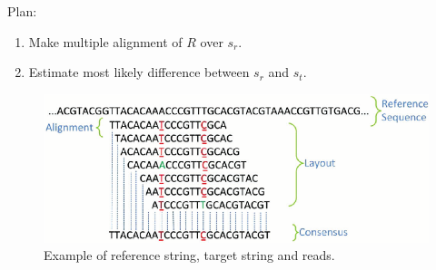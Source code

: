 \documentclass[a4paper, 12pt]{article}
\theoremstyle{definition}
\theoremstyle{definition}
\theoremstyle{remark}
\begin{document}
Plan:
\begin{enumerate}
    \item Make multiple alignment of $R$ over $s_r$.
    \item Estimate most likely difference between $s_r$ and $s_t$.
\end{enumerate}

\begin{figure}[H]
    \includegraphics[scale=0.5]{aligned_reads.png}
    \centering
    \caption{Example of reference string, target string and reads.}
\end{figure}
\end{document}
